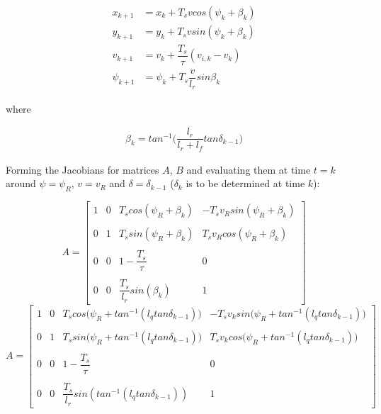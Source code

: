 \begin{align}
  x_{k+1} &= x_{k} + T_s v cos(\psi_k + \beta_k) \\
  y_{k+1} &= y_{k} + T_s v sin(\psi_k + \beta_k) \\
  v_{k+1} &= v_{k} + \dfrac{T_s}{\tau} (v_{i,k} - v_{k}) \\
  \psi_{k+1} &= \psi_{k} + T_s \dfrac{v}{l_r} sin\beta_k
\end{align}

where

\begin{align}
  \beta_k = tan^{-1}\Big(\dfrac{l_r}{l_r + l_f} tan\delta_{k-1}\Big)
\end{align}


Forming the Jacobians for matrices $A$, $B$ and evaluating them at time
$t=k$ around $\psi = \psi_R$, $v = v_R$ and $\delta = \delta_{k-1}$
($\delta_k$ is to be determined at time $k$):

\begin{equation}
 A =
  \begin{bmatrix}
    1 & 0 & T_s cos(\psi_R + \beta_k) & -T_s v_R sin(\psi_R + \beta_k) \\\\
    0 & 1 & T_s sin(\psi_R + \beta_k) & T_s v_R cos(\psi_R + \beta_k) \\\\
    0 & 0 & 1-\dfrac{T_s}{\tau} & 0 \\\\
    0 & 0 & \dfrac{T_s}{l_r}sin(\beta_k) & 1
  \end{bmatrix}
\end{equation}
\begin{equation}
  A =
  \begin{bmatrix}
    1 & 0 & T_s cos\Big(\psi_R + tan^{-1} (l_q tan\delta_{k-1})\Big) & -T_s v_k sin\Big(\psi_R + tan^{-1} (l_q tan\delta_{k-1})\Big) \\\\
    0 & 1 & T_s sin\Big(\psi_R + tan^{-1} (l_q tan\delta_{k-1})\Big) & T_s v_k cos\Big(\psi_R + tan^{-1} (l_q tan\delta_{k-1})\Big) \\\\
    0 & 0 & 1-\dfrac{T_s}{\tau} & 0 \\\\
    0 & 0 & \dfrac{T_s}{l_r}sin(tan^{-1} (l_q tan\delta_{k-1})) & 1
  \end{bmatrix}
\end{equation}


